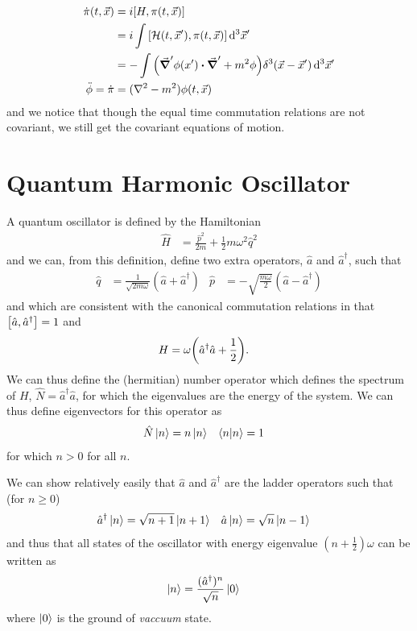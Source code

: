 \documentclass[notes.tex]{subfiles}
\begin{document}
\begin{align*}
    \dot{\pi}(t, \vec{x}) &= i\commutator{H}{\pi(t, \vec{x})}\\
    &= i \int \commutator{\mathcal{H}(t, \vec{x}^\prime)}{\pi(t, \vec{x})}\dd[3]{\vec{x}^\prime}\\
    &= - \int \qty(\grad^\prime\phi(x^\prime)\vdot\grad^\prime + m^2 \phi)\delta^3(\vec{x} - \vec{x}^\prime)  \dd[3]{\vec{x}^\prime}\\
    \ddot{\phi} = \dot{\pi} &= (\laplacian-m^2)\phi(t, \vec{x})
\end{align*}
and we notice that though the equal time commutation relations are not covariant, we still get the covariant equations of motion.

\section{Quantum Harmonic Oscillator}
A quantum oscillator is defined by the Hamiltonian
\begin{align*}
    \hat{H} &= \frac{\hat{p}^2}{2m} + \frac{1}{2} m \omega^2 \hat{q}^2
\end{align*}
and we can, from this definition, define two extra operators, $\hat{a}$ and $\hat{a}^\dagger$, such that
\begin{align*}
    \hat{q} &= \frac{1}{\sqrt{2m\omega}}(\hat{a} + \hat{a}^\dagger) & \hat{p} &= -\sqrt{\frac{m\omega}{2}} (\hat{a} - \hat{a}^\dagger)
\end{align*}
and which are consistent with the canonical commutation relations in that
    $\commutator{\hat{a}}{\hat{a}^\dagger} = 1$
and
\begin{align*}
    H &= \omega\qty(\hat{a}^\dagger\hat{a} + \frac{1}{2}).
\end{align*}
We can thus define the (hermitian) number operator which defines the spectrum of $H$, $\hat{N} = \hat{a}^\dagger\hat{a}$, for which the eigenvalues are the energy of the system.
We can thus define eigenvectors for this operator as 
\begin{align*}
    \hat{N}\ket{n} &= n\ket{n} & \braket{n}{n} &= 1
\end{align*}
for which $n>0$ for all $n$.

We can show relatively easily that $\hat{a}$ and $\hat{a}^\dagger$ are the ladder operators such that (for $n\geq 0$)
\begin{align*}
    \hat{a}^\dagger \ket{n} &= \sqrt{n+1}\ket{n+1} & \hat{a}\ket{n} &= \sqrt{n}\ket{n-1}
\end{align*}
and thus that all states of the oscillator with energy eigenvalue $(n+\frac{1}{2})\omega$ can be written as 
\begin{align*}
    \ket{n} &= \frac{(\hat{a}^\dagger)^n}{\sqrt{n}}\ket{0}
\end{align*}
where $\ket{0}$ is the ground of \emph{vaccuum} state.
\end{document}
